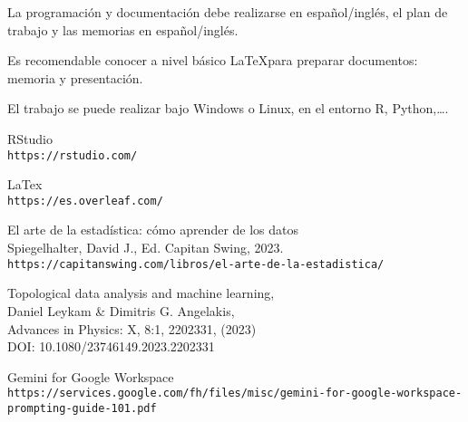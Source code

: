 La programaci\'on y documentaci\'on debe realizarse en espa\~nol/ingl\'es,
el plan de trabajo y las memorias en espa\~nol/ingl\'es.

Es recomendable conocer a nivel b\'asico \LaTeX para preparar documentos: memoria y presentación.

El trabajo se puede realizar bajo Windows o Linux, en el entorno R, Python,\ldots.


\begin{thebibliography}{90}

  RStudio \\
   {\tt https://rstudio.com/}

  LaTex \\
{\tt https://es.overleaf.com/}

  El arte de la estadística: cómo aprender de los datos \\
  Spiegelhalter, David J., Ed. Capitan Swing, 2023.\\
{\tt https://capitanswing.com/\-libros/el-arte-de-la-estadistica/}

Topological data analysis and machine learning, \\
Daniel Leykam \& Dimitris G. Angelakis,  \\
Advances in Physics: X, 8:1, 2202331, (2023)\\
DOI: 10.1080/23746149.2023.2202331

  Gemini for Google Workspace \\
{\tt https://services.google.com/\-fh/files/misc/gemini-for-google-workspace-prompting-guide-101.pdf}

\end{thebibliography}

